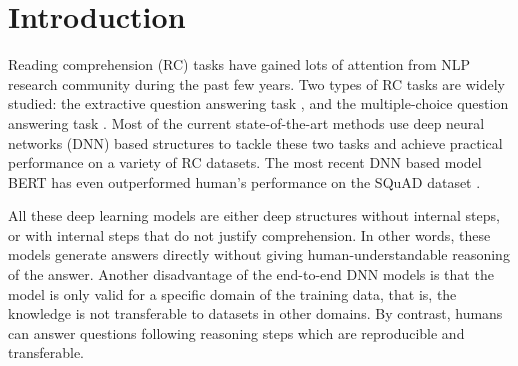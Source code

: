 \section{Introduction}

Reading comprehension (RC) tasks have gained lots of attention from NLP research community during the past few years.  Two types of RC tasks are widely studied: the extractive question answering task \cite{DBLP:conf/emnlp/RajpurkarZLL16,DBLP:conf/acl/RajpurkarJL18}, and the  multiple-choice question answering task \cite{DBLP:conf/aaai/AydinYLLGD14,DBLP:conf/aaai/KhashabiKSR18}. Most of the current state-of-the-art methods use deep neural networks (DNN) based structures to tackle these two tasks and achieve practical performance on a variety of RC datasets. The most recent DNN based model BERT \cite{DBLP:journals/corr/abs-1810-04805} has even outperformed human's performance on the SQuAD dataset \cite{DBLP:conf/emnlp/RajpurkarZLL16}.%



All these deep learning models are either deep structures without internal steps, or with internal steps that do not justify comprehension. In other words, these models generate answers directly without giving human-understandable reasoning of the answer. %
Another disadvantage of the end-to-end DNN models is that the model is only valid for a specific domain of the training data, that is, the knowledge is not transferable to datasets in other domains. %
By contrast, humans can answer questions following reasoning steps which are reproducible and transferable.  

